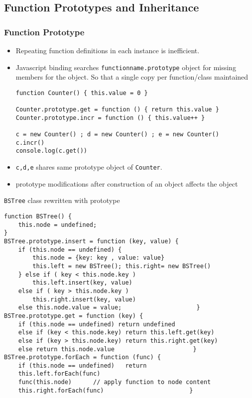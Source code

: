 \documentclass[trans,compress,xcolor=table]{beamer}
\begin{document}
\subsection{Function Prototypes and Inheritance}
\begin{frame}[fragile]
\frametitle{Function Prototype}
\begin{itemize}
\item Repeating function definitions in each instance is inefficient.
\item Javascript binding searches \lstinline!functionname.prototype! object
for missing members for the object. So that a single copy per function/class maintained
\begin{lstlisting}
function Counter() { this.value = 0 }

Counter.prototype.get = function () { return this.value }
Counter.prototype.incr = function () { this.value++ }

c = new Counter() ; d = new Counter() ; e = new Counter()
c.incr()
console.log(c.get())
\end{lstlisting}
\item \lstinline!c,d,e!  shares same prototype object of \lstinline!Counter!.
\item \alert{prototype modifications after construction of an object affects the object}
\end{itemize}
\end{frame}

\begin{frame}[fragile]
\lstinline!BSTree! class rewritten with prototype
\begin{lstlisting}
function BSTree() {
    this.node = undefined;	
}
BSTree.prototype.insert = function (key, value) {
    if (this.node == undefined) {
        this.node = {key: key , value: value}
        this.left = new BSTree(); this.right= new BSTree()
    } else if ( key < this.node.key ) 
        this.left.insert(key, value)
    else if ( key > this.node.key )
        this.right.insert(key, value)
    else this.node.value = value;                     } 
BSTree.prototype.get = function (key) {
    if (this.node == undefined) return undefined
    else if (key < this.node.key) return this.left.get(key)
    else if (key > this.node.key) return this.right.get(key)
    else return this.node.value                      }
BSTree.prototype.forEach = function (func) {
    if (this.node == undefined)   return
    this.left.forEach(func)
    func(this.node)      // apply function to node content
    this.right.forEach(func)                        }
\end{lstlisting}
\end{frame}
\end{document}
